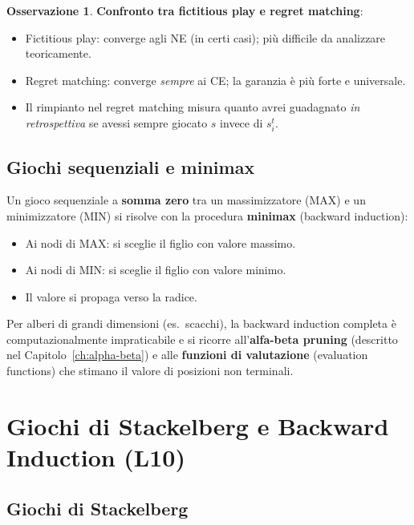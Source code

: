 \documentclass[12pt,a4paper,twoside]{book}
\theoremstyle{plain}
\theoremstyle{definition}
\newtheorem{remark}[theorem]{Osservazione}
\begin{document}
\begin{remark}
\textbf{Confronto tra fictitious play e regret matching}:
\begin{itemize}
  \item Fictitious play: converge agli NE (in certi casi); più difficile da analizzare teoricamente.
  \item Regret matching: converge \emph{sempre} ai CE; la garanzia è più forte e universale.
  \item Il rimpianto nel regret matching misura quanto avrei guadagnato \emph{in retrospettiva} se avessi sempre giocato $s$ invece di $s_i^t$.
\end{itemize}
\end{remark}

\section{Giochi sequenziali e minimax}\label{sec:minimax-intro}

Un gioco sequenziale a \textbf{somma zero} tra un massimizzatore (MAX) e un minimizzatore (MIN) si risolve con la procedura \textbf{minimax} (backward induction):
\begin{itemize}
  \item Ai nodi di MAX: si sceglie il figlio con valore massimo.
  \item Ai nodi di MIN: si sceglie il figlio con valore minimo.
  \item Il valore si propaga verso la radice.
\end{itemize}
Per alberi di grandi dimensioni (es.\ scacchi), la backward induction completa è computazionalmente impraticabile e si ricorre all'\textbf{alfa-beta pruning} (descritto nel Capitolo~\ref{ch:alpha-beta}) e alle \textbf{funzioni di valutazione} (evaluation functions) che stimano il valore di posizioni non terminali.

\chapter{Giochi di Stackelberg e Backward Induction (L10)}
\label{ch:stackelberg}

\section{Giochi di Stackelberg}
\end{document}

